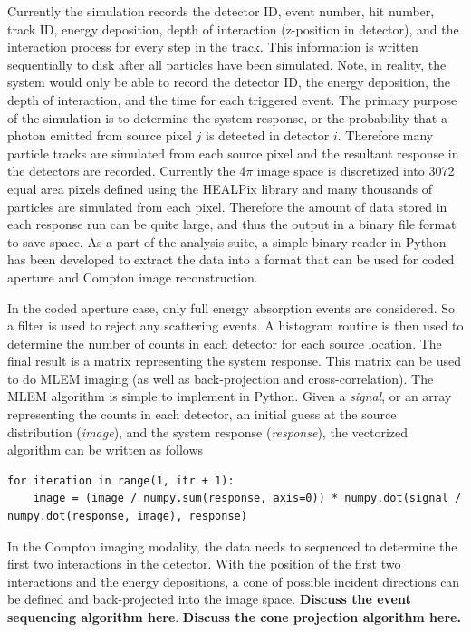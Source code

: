 \documentclass[10pt]{article}
\begin{document}
Currently the simulation records the detector ID, event number, hit number, track ID, energy deposition, depth of interaction (z-position in detector), and the interaction process for every step in the track. This information is written sequentially to disk after all particles have been simulated. Note, in reality, the system would only be able to record the detector ID, the energy deposition, the depth of interaction, and the time for each triggered event. The primary purpose of the simulation is to determine the system response, or the probability that a photon emitted from source pixel $j$ is detected in detector $i$. Therefore many particle tracks are simulated from each source pixel and the resultant response in the detectors are recorded. Currently the 4$\pi$ image space is discretized into 3072 equal area pixels defined using the HEALPix library \cite{Healpix2005} and many thousands of particles are simulated from each pixel. Therefore the amount of data stored in each response run can be quite large, and thus the output in a binary file format to save space. As a part of the analysis suite, a simple binary reader in Python has been developed to extract the data into a format that can be used for coded aperture and Compton image reconstruction.

In the coded aperture case, only full energy absorption events are considered. So a filter is used to reject any scattering events. A histogram routine is then used to determine the number of counts in each detector for each source location. The final result is a matrix representing the system response. This matrix can be used to do MLEM imaging (as well as back-projection and cross-correlation). The MLEM algorithm is simple to implement in Python. Given a \emph{signal}, or an array representing the counts in each detector, an initial guess at the source distribution (\emph{image}), and the system response (\emph{response}), the vectorized algorithm can be written as follows

\begin{lstlisting}
for iteration in range(1, itr + 1):
	image = (image / numpy.sum(response, axis=0)) * numpy.dot(signal / numpy.dot(response, image), response)
\end{lstlisting}

In the Compton imaging modality, the data needs to sequenced to determine the first two interactions in the detector. With the position of the first two interactions and the energy depositions, a cone of possible incident directions can be defined and back-projected into the image space. \textbf{Discuss the event sequencing algorithm here}. \textbf{Discuss the cone projection algorithm here.}
\end{document}
